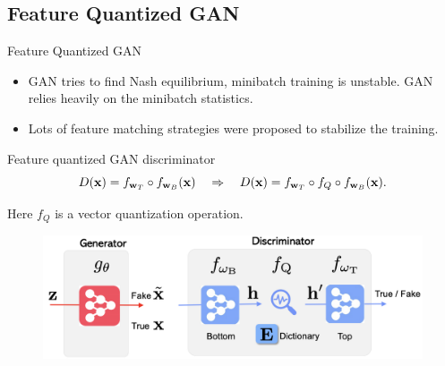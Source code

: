 \subsection{Feature Quantized GAN}
\begin{frame}{Feature Quantized GAN}
	\begin{itemize}
		\item GAN tries to find Nash equilibrium, minibatch training is unstable. GAN relies heavily on the minibatch statistics.
		\item Lots of feature matching strategies were proposed to stabilize the training. 
	\end{itemize}
	\begin{block}{Feature quantized GAN discriminator}
		\[
			D(\mathbf{x}) = f_{\mathbf{w}_T} \circ f_{\mathbf{w}_B}(\mathbf{x}) \quad \Rightarrow \quad D(\mathbf{x}) = f_{\mathbf{w}_T} \circ f_Q \circ f_{\mathbf{w}_B}(\mathbf{x}). 
		\]
	\end{block}
	Here $f_Q$ is a vector quantization operation.
	\begin{figure}
		\centering
		\includegraphics[width=0.7\linewidth]{figs/fqgan}
	\end{figure}
\end{frame}
